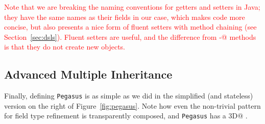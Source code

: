 \textcolor{red}{Note that we are breaking the naming conventions for getters and setters in Java;
they have the same names as their fields in our case, which makes code more concise,
but also presents a nice form of fluent setters with method chaining (see Section~\ref{sec:dsls}).
Fluent setters are useful, and the difference from \Q@with-@ methods is that they do not create new objects.}

\subsection{Advanced Multiple Inheritance}
Finally, defining \texttt{Pegasus} is as simple as we did in the simplified
(and stateless) version on the right of Figure~\ref{fig:pegasus}.
 Note how even the non-trivial pattern for field type refinement is
transparently composed, and \texttt{Pegasus} has a \Q@Point3D@
\Q@location@.%



